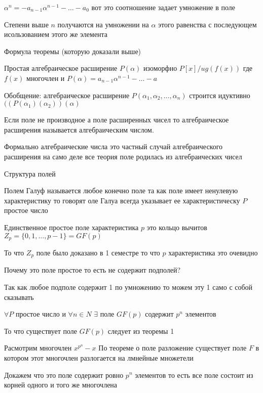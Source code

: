 $\alpha^n = - a_{n-1}\alpha^{n-1} - \ldots - a_0$ вот это соотношение задает
умножение в поле

Степени выше $n$ получаются на умножении на $\alpha$ этого равенства с
последующем исользованием этого же элемента

Формула теоремы (которую доказали выше)

Простая алгебраическое расширение $P(\alpha)$ изоморфно $P[x]/ug(f(x))$ где
$f(x)$ многочлен и $P(\alpha) = a_{n-1}\alpha^{n-1}- \ldots - a$

Обобщение: алгебраическое расширение $P(\alpha_1, \alpha_2, \ldots, \alpha_n)$
строится идуктивно $((P(\alpha_1)(\alpha_2))(\alpha)$

Если поле не производное а поле расширенных чисел то алгебраическое расширения
называется алгебраическим числом.

Формально алгебраические числа это частный случай алгебраического расширения на
само деле все теория поле родилась из алгебраических чисел

\begin{title}[\large]
  Структура полей
\end{title}

Полем Галуф называется любое конечно поле та как поле имеет ненулевую
характеристику то говорят оле Галуа всегда указывает ее характеристическу $P$
простое число

\begin{theorem}
  Единственное простое поле характеристика $p$ это кольцо вычитов
  $Z_p = \{0,1, \ldots, p-1\} = GF(p)$
\end{theorem}

То что $Z_p$ поле было доказано в 1 семестре то что $p$ характеристика это
очевидно

Почему это поле простое то есть не содержит подполей?

Так как любое подполе содержит 1 по умножению то можем эту 1 само с собой
сказывать

\begin{theorem}
  $\forall P$ простое число и $\forall n \in N$ $\exists$ поле $GF(p)$ содержит
  $p^n$ элементов
\end{theorem}

То что существует поле $GF(p)$ следует из теоремы 1

Расмотрим многочлен $x^{p^n} - x$ По теореме о поле разложение существует поле
$F$ в котором этот многочлен разлогается на лмнейные множетели

Докажем что это поле содержит ровно $p^n$ элементов то есть все поле состоит из
корней одного и того же многочлена

